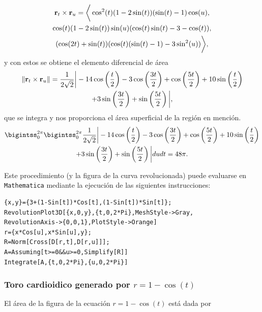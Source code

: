 \begin{multline*}
{\bf r}_{t}\times {\bf r}_{u}=\bigg\langle\cos^{2}(t)(1-2\sin(t))(\sin(t)-1)\cos(u),\\
\cos(t)(1-2\sin(t))\sin (u)(\cos(t)\sin(t)-3-\cos(t)),\\
(\cos(2t)+\sin(t))(\cos(t)(\sin(t)-1)-3\sin^{2}(u))\bigg\rangle,
\end{multline*}
y con estos se obtiene el elemento diferencial de área
\begin{multline*}
\left\|{\bf r}_{t}\times {\bf r}_{u}\right\|=\frac{1}{2\sqrt{2}}\bigg|-14\cos\left(\frac{t}{2}\right)-3\cos\left(\frac{3t}{2}\right)+\cos\left(\frac{5t}{2}\right)+10\sin\left(\frac{t}{2}\right)\\
+3\sin\left(\frac{3t}{2}\right)+\sin\left(\frac{5t}{2}\right)\bigg|,
\end{multline*}
que se integra y nos proporciona el área superficial de la región en mención.
\begin{multline*}
\bigintss_{0}^{2\pi}\bigintss_{0}^{2\pi}\frac{1}{2\sqrt{2}}\bigg|-14\cos\left(\frac{t}{2}\right)-3\cos\left(\frac{3t}{2}\right)+\cos\left(\frac{5t}{2}\right)+10\sin\left(\frac{t}{2}\right)\\
+3\sin\left(\frac{3t}{2}\right)+\sin\left(\frac{5t}{2}\right)\bigg|dudt=48\pi.
\end{multline*}

Este procedimiento (y la figura de la curva revolucionada) puede evaluarse en \verb"Mathematica"
mediante la ejecución de las siguientes instrucciones:

\begin{tcolorbox}[title=\bf Instrucción en \verb"Mathematica"]\begin{Verbatim}[formatcom=\letraverbatim]
{x,y}={3+(1-Sin[t])*Cos[t],(1-Sin[t])*Sin[t]};
RevolutionPlot3D[{x,0,y},{t,0,2*Pi},MeshStyle->Gray,
RevolutionAxis->{0,0,1},PlotStyle->Orange]
r={x*Cos[u],x*Sin[u],y};
R=Norm[Cross[D[r,t],D[r,u]]];
A=Assuming[t>=0&&u>=0,Simplify[R]]
Integrate[A,{t,0,2*Pi},{u,0,2*Pi}]
\end{Verbatim}
\end{tcolorbox}

\subsubsection{Toro cardioidico generado por \texorpdfstring{\boldmath$r=1-\cos(t)$\unboldmath}{r=1-cos(t)}}

El área de la figura de la ecuación $r=1-\cos(t)$ está dada por

